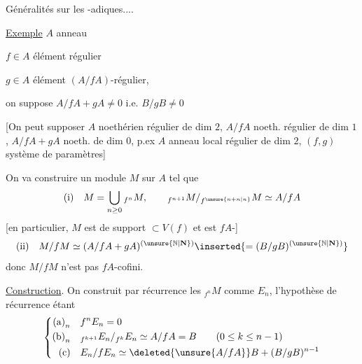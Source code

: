 Généralités sur les
 -adiques....

\uline{Exemple} \quad $A$ anneau 

$f\in A$ élément régulier

$g\in A$ élément $(A/fA)$-régulier, \unsure{\&}

on suppose $A/fA+gA\ne0$ i.e. $B/gB\ne0$

[On peut supposer $A$ noethérien régulier de dim $2$,
$A/fA$ noeth. régulier de dim $1$,
$A/fA+gA$ noeth.  de dim $0$,
p.ex $A$ anneau local régulier de dim $2$,
$(f,g)$ système de paramètres]

On va construire un module $M$ sur $A$ tel que
\[
\text{(i)}\quad M=\bigcup_{n\geq0}{}_{f^n}M,\qquad
{}_{f^{n+1}}M/{}_{f^{\unsure{n+n|n}}}M\simeq A/fA
\]
[en particulier, $M$ est de support $\subset V(f)$ et est
$fA$-]
\[
\text{(ii)}\quad M/fM\simeq(A/fA+gA)^{(\unsure{\mathbb N|\mathbf N})}\inserted{=(B/gB)^{(\unsure{\mathbb N|\mathbf N})}}
\]
donc $M/fM$ n'est pas $fA$-cofini.

\uline{Construction}. On construit par récurrence les
${}_{f^n}M$ comme $E_n$, l'hypothèse de
récurrence étant
\[
\left\{\begin{aligned}
\text{(a)}_n\quad & f^nE_n=0\\
\text{(b)}_n\quad & {}_{f^{k+1}}E_n/{}_{f^k}E_n\simeq A/fA=B\qquad(0\leq k\leq n-1)\\
\text{(c)}\quad & E_n/fE_n\simeq\deleted{\unsure{A/fA}}B+(B/gB)^{n-1}
\end{aligned}\right.
\]

